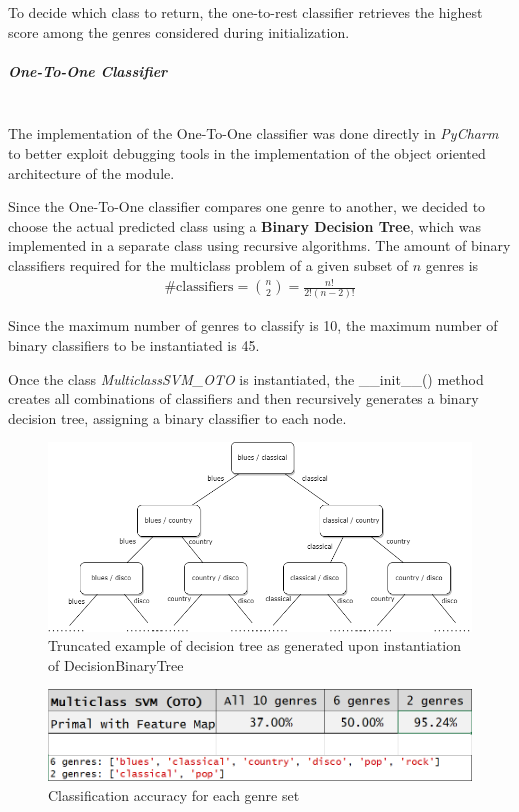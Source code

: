 \documentclass[12pt]{article}
\begin{document}
	To decide which class to return, the one-to-rest classifier retrieves the highest score  among the genres considered during initialization.
	\newpage
	\subparagraph{One-To-One Classifier}\mbox{}\\\newline
	The implementation of the One-To-One classifier was done directly in \textit{PyCharm} to better exploit debugging tools in the implementation of the object oriented architecture of the module.
	
	Since the One-To-One classifier compares one genre to another, we decided to choose the actual predicted class using a \textbf{Binary Decision Tree}, which was implemented in a separate class using recursive algorithms. The amount of binary classifiers required for the multiclass problem of a given subset of $\mathit{n}$ genres is
	\begin{align}
		\text{\# classifiers} = \binom{n}{2} = \frac{n!}{2!(n-2)!}
	\end{align}

	Since the maximum number of genres to classify is 10, the maximum number of binary classifiers to be instantiated is 45.
	
	Once the class \textit{MulticlassSVM\_OTO} is instantiated, the \_\_init\_\_() method creates all combinations of classifiers and then recursively generates a binary decision tree, assigning a binary classifier to each node.
	\begin{figure}[H]
		\hspace{70pt}\includegraphics[scale=0.44]{decision_tree}
		\caption{Truncated example of decision tree as generated upon instantiation of DecisionBinaryTree}
	\end{figure}
	\begin{figure}[H]
		\hspace{80pt}\includegraphics[scale=0.6]{svm_oto_acc}
		\caption{Classification accuracy for each genre set}
	\end{figure}
	\newpage
	
\end{document}
